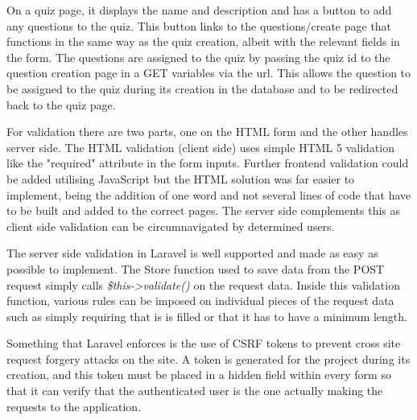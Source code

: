 On a quiz page, it displays the name and description and has a button to add any questions to the quiz. This button links to the questions/create page that functions in the same way as the quiz creation, albeit with the relevant fields in the form. The questions are assigned to the quiz by passing the quiz id to the question creation page in a GET variables via the url. This allows the question to be assigned to the quiz during its creation in the database and to be redirected back to the quiz page.

For validation there are two parts, one on the HTML form and the other handles server side. The HTML validation (client side) uses simple HTML 5 validation like the "required" attribute in the form inputs. Further frontend validation could be added utilising JavaScript but the HTML solution was far easier to implement, being the addition of one word and not several lines of code that have to be built and added to the correct pages. The server side complements this as client side validation can be circumnavigated by determined users.

The server side validation in Laravel is well supported and made as easy as possible to implement. The Store function used to save data from the POST request simply calls \textit{\$this-\textgreater validate()} on the request data. Inside this validation function, various rules can be imposed on individual pieces of the request data such as simply requiring that is is filled or that it has to have a minimum length\cite{laravel-validation}.

Something that Laravel enforces is the use of CSRF tokens to prevent cross site request forgery attacks on the site. A token is generated for the project during its creation, and this token must be placed in a hidden field within every form so that it can verify that the authenticated user is the one actually making the requests to the application\cite{laravel-csrf}.
